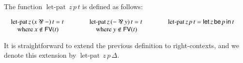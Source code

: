 \documentclass{elsarticle}
\newcommand{\FILLnt}[1]{\mathit{#1}}
\newcommand{\FILLmv}[1]{\mathit{#1}}
\newcommand{\FILLsym}[1]{#1}
\begin{document}
\begin{definition}
  \label{def:let-pat-term}
  The function $ \mathsf{\operatorname{let-pat} }\, \FILLmv{z} \, \FILLnt{p} \, \FILLnt{t} $ is defined as follows:
  \begin{center}
  \footnotesize
    \begin{math}
      \begin{array}{lllllllll}      
        \begin{array}{lll}
           \mathsf{\operatorname{let-pat} }\, \FILLmv{z} \, \FILLsym{(}   \FILLmv{x}  \parr   -    \FILLsym{)} \, \FILLnt{t}  = \FILLnt{t}\\
          \,\,\,\,\,\,\text{where } \FILLmv{x} \not\in \mathsf{FV}(\FILLnt{t})\\
        \end{array}
        & \quad &
          \begin{array}{lll}
             \mathsf{\operatorname{let-pat} }\, \FILLmv{z} \, \FILLsym{(}    -   \parr  \FILLmv{y}   \FILLsym{)} \, \FILLnt{t}  = \FILLnt{t}\\
        \,\,\,\,\,\,\text{where } \FILLmv{y} \not\in \mathsf{FV}(\FILLnt{t})\\
          \end{array}
        & \quad &
          \begin{array}{lll}
             \mathsf{\operatorname{let-pat} }\, \FILLmv{z} \, \FILLnt{p} \, \FILLnt{t}  =  \mathsf{let}\, \FILLmv{z} \,\mathsf{be}\, \FILLnt{p} \,\mathsf{in}\, \FILLnt{t} \\
            & \\
          \end{array}
      \end{array}
    \end{math}
  \end{center}
  It is straightforward to extend the previous definition to
  right-contexts, and we denote this extension by $ \mathsf{\operatorname{let-pat} }\, \FILLmv{z} \, \FILLnt{p} \, \Delta $.
\end{definition}
\end{document}
